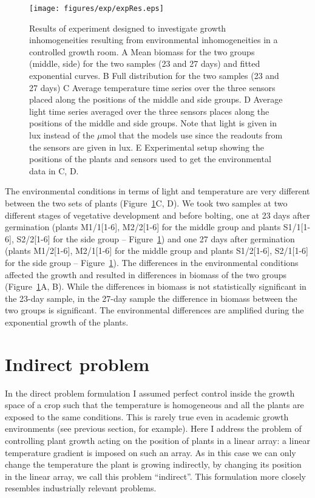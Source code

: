 \begin{figure}[tb]
\centering
\texttt{[image: figures/exp/expRes.eps]}
\caption{ Results of experiment designed to investigate growth inhomogeneities
  resulting from environmental inhomogeneities in a controlled growth room. A
  Mean biomass for the two groups (middle, side) for the two samples (23 and 27
  days) and fitted exponential curves. B Full distribution for the two samples
  (23 and 27 days) C Average temperature time series over the three sensors
  placed along the positions of the middle and side groups. D Average light time
  series averaged over the three sensors places along the positions of the
  middle and side groups. Note that light is given in lux instead of the
  $\mu\mathrm{mol}$ that the models use since the readouts from the sensors are
  given in lux. E Experimental setup showing the positions of the plants and
  sensors used to get the environmental data in C, D.  }
\label{fig:expRes}
\end{figure}

The environmental conditions in terms of light and temperature are very
different between the two sets of plants (Figure~\ref{fig:expRes}C, D). We took
two samples at two different stages of vegetative development and before
bolting, one at 23 days after germination (plants M1/1[1-6], M2/2[1-6] for the
middle group and plants S1/1[1-6], S2/2[1-6] for the side group --
Figure~\ref{fig:expRes}) and one 27 days after germination (plants M1/2[1-6],
M2/1[1-6] for the middle group and plants S1/2[1-6], S2/1[1-6] for the side
group -- Figure~\ref{fig:expRes}). The differences in the environmental
conditions affected the growth and resulted in differences in biomass of the two
groups (Figure~\ref{fig:expRes}A, B). While the differences in biomass is not
statistically significant in the 23-day sample, in the 27-day sample the
difference in biomass between the two groups is significant. The environmental
differences are amplified during the exponential growth of the plants.


\section{Indirect problem}
In the direct problem formulation I assumed perfect control inside the growth
space of a crop such that the temperature is homogeneous and all the plants are
exposed to the same conditions. This is rarely true even in academic growth
environments (see previous section, for example). Here I address the problem of
controlling plant growth acting on the position of plants in a linear array: a
linear temperature gradient is imposed on such an array. As in this case we can
only change the temperature the plant is growing indirectly, \ie by changing its
position in the linear array, we call this problem ``indirect''. This
formulation more closely resembles industrially relevant problems.


